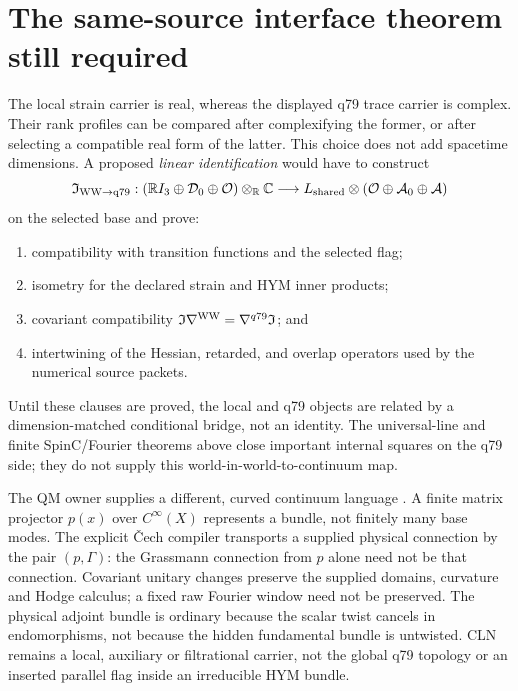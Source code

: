 \documentclass[11pt]{article}
\begin{document}
\section{The same-source interface theorem still required}
\label{sec:consumer-geometry}

The local strain carrier is real, whereas the displayed q79 trace carrier is
complex. Their rank profiles can be compared after complexifying the former,
or after selecting a compatible real form of the latter. This choice does
not add spacetime dimensions. A proposed \emph{linear identification} would
have to construct
\[
 \mathfrak I_{\rm WW\to q79}:
 (\mathbb RI_3\oplus\mathcal D_0\oplus\mathcal O)\otimes_{\mathbb R}\mathbb C
 \longrightarrow
 L_{\rm shared}\otimes
 (\mathcal O\oplus\mathcal A_0\oplus\mathcal A)
\]
on the selected base and prove:
\begin{enumerate}
\item compatibility with transition functions and the selected flag;
\item isometry for the declared strain and HYM inner products;
\item covariant compatibility
$\mathfrak I\nabla^{\rm WW}=\nabla^{q79}\mathfrak I$; and
\item intertwining of the Hessian, retarded, and overlap operators used by the
numerical source packets.
\end{enumerate}
Until these clauses are proved, the local and q79 objects are related by a
dimension-matched conditional bridge, not an identity. The universal-line and
finite SpinC/Fourier theorems above close important internal squares on the q79
side; they do not supply this world-in-world-to-continuum map.

The QM owner supplies a different, curved continuum language
\cite{QMGeometry,FrozenProjective,FrozenCech}. A finite matrix projector
$p(x)$ over $C^\infty(X)$ represents a bundle, not finitely many base modes.
The explicit \v{C}ech compiler transports a supplied physical connection by
the pair $(p,\Gamma)$: the Grassmann connection from $p$ alone need not be
that connection. Covariant unitary changes preserve the supplied domains,
curvature and Hodge calculus; a fixed raw Fourier window need not be preserved.
The physical adjoint bundle is ordinary because the scalar twist cancels in
endomorphisms, not because the hidden fundamental bundle is untwisted.
CLN remains a local, auxiliary or filtrational carrier, not the global q79
topology or an inserted parallel flag inside an irreducible HYM bundle.
\end{document}
